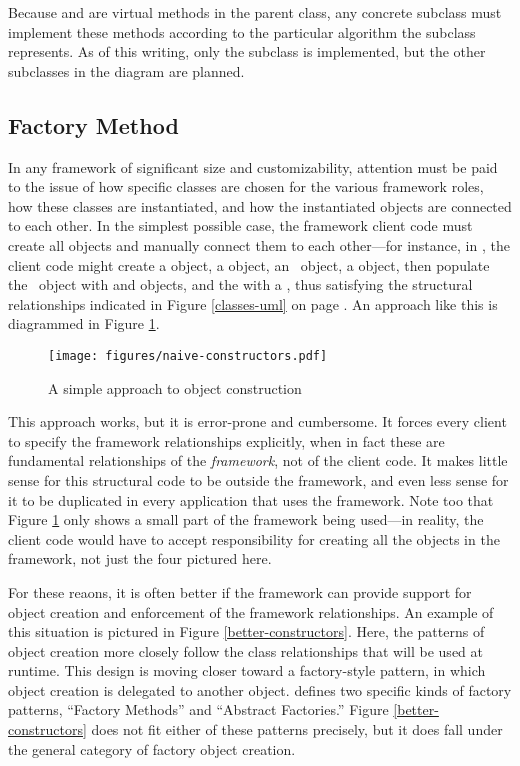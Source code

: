 Because  and  are
virtual methods in the parent class, any concrete subclass must
implement these methods according to the particular algorithm the
subclass represents.  As of this writing, only the
 subclass is implemented, but
the other subclasses in the diagram are planned.


\subsection{Factory Method}

In any framework of significant size and customizability, attention
must be paid to the issue of how specific classes are chosen for the
various framework roles, how these classes are instantiated, and how
the instantiated objects are connected to each other.  In the simplest
possible case, the framework client code must create all objects and
manually connect them to each other---for instance, in \aicat, the
client code might create a  object, a
 object, an \aicat\ object, a 
object, then populate the \aicat\ object with  and
 objects, and the  with a
, thus satisfying the structural relationships
indicated in Figure \ref{classes-uml} on page \pageref{classes-uml}.
An approach like this is diagrammed in Figure
\ref{naive-constructors}.

\begin{figure}
\texttt{[image: figures/naive-constructors.pdf]}
\caption{A simple approach to object construction}
\label{naive-constructors}
\end{figure}

This approach works, but it is error-prone and cumbersome.  It forces
every client to specify the framework relationships explicitly, when
in fact these are fundamental relationships of the \emph{framework},
not of the client code.  It makes little sense for this structural
code to be outside the framework, and even less sense for it to be
duplicated in every application that uses the framework.  Note too
that Figure \ref{naive-constructors} only shows a small part of the
framework being used---in reality, the client code would have to
accept responsibility for creating all the objects in the framework,
not just the four pictured here.

For these reaons, it is often better if the framework can provide
support for object creation and enforcement of the framework
relationships.  An example of this situation is pictured in Figure
\ref{better-constructors}.  Here, the patterns of object creation more
closely follow the class relationships that will be used at runtime.
This design is moving closer toward a factory-style pattern, in which
object creation is delegated to another object. \cite{gamma:95}
defines two specific kinds of factory patterns, ``Factory Methods''
and ``Abstract Factories.''  Figure \ref{better-constructors} does not
fit either of these patterns precisely, but it does fall under the
general category of factory object creation.

